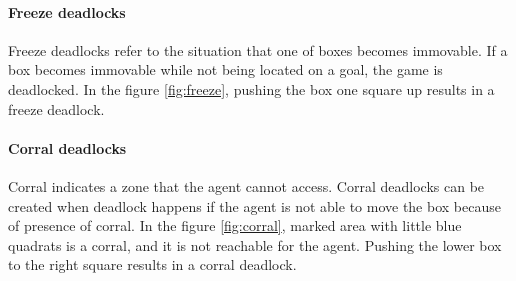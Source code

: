 \documentclass{article}
\begin{document}
\paragraph{Freeze deadlocks}
Freeze deadlocks refer to the situation that one of boxes becomes immovable. If a box becomes immovable while not being located on a goal, the game is deadlocked. In the figure \ref{fig:freeze}, pushing the box one square up results in a freeze deadlock.

\paragraph{Corral deadlocks}
Corral indicates a zone that the agent cannot access. Corral deadlocks can be created when deadlock happens if the agent is not able to move the box because of presence of corral. In the figure \ref{fig:corral}, marked area with little blue quadrats is a corral, and it is not reachable for the agent. Pushing the lower box to the right square results in a corral deadlock.
\end{document}
